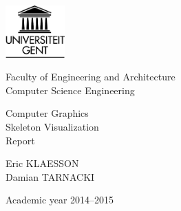 

\begin{titlepage}

\setlength{\hoffset}{-1.3in}
\setlength{\voffset}{-1in}
\setlength{\topmargin}{1.5cm}
\setlength{\headheight}{0.5cm}
\setlength{\headsep}{1cm}
\setlength{\oddsidemargin}{3cm}
\setlength{\evensidemargin}{3cm}
\setlength{\footskip}{1.5cm}
\enlargethispage{1cm}

\fontsize{14pt}{16pt}
\selectfont

\begin{center}

\includegraphics[height=2cm]{fig/ruglogo}

\vspace{0.5cm}

Faculty of Engineering and Architecture\\
Computer Science Engineering\\

\vspace{3.5cm}

\fontsize{20.74pt}{23pt}
\selectfont

Computer Graphics\\ 
Skeleton Visualization\\
Report

\fontsize{14pt}{16pt}
\selectfont

\vspace{2.2cm}

Eric KLAESSON\\
Damian TARNACKI


\vspace{6.4cm}

Academic year 2014--2015

\end{center}
\end{titlepage}